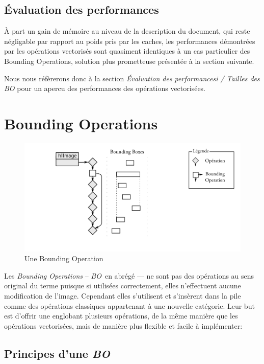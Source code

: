 		\subsection{Évaluation des performances}
		À part un gain de mémoire au niveau de la description du document, qui reste négligable par rapport au poids pris
		par les caches, les performances démontrées par les opérations vectorisés sont quasiment identiques à un cas particulier
		des Bounding Operations, solution plus prometteuse présentée à la section suivante.

		Nous nous réfèrerons donc à la section \emph{Évaluation des performancesi / Tailles des \emph{BO}} 
		pour un apercu des performances des opérations vectorisées.  

	\section{Bounding Operations}
\newcommand{\BO}{\emph{BO}~}
		\begin{figure}[ht]
			\centering
			\includegraphics[width=\textwidth]{images/bo} 
			\caption{Une Bounding Operation}
			\label{fig:bo}
		\end{figure}
		Les \emph{Bounding Operations} -- \BO en abrégé --- ne sont pas des opérations au sens original du terme puisque si utilisées
		correctement, elles n'effectuent aucune modification de l'image. Cependant elles s'utilisent et s'insèrent
		dans la pile comme des opérations classiques  appartenant à une nouvelle catégorie.  Leur but est d'offrir une \BB englobant
		plusieurs opérations, de la même manière que les opérations vectorisées, mais de manière plus flexible et facile à implémenter:

		\subsection{Principes d'une \BO}
		
